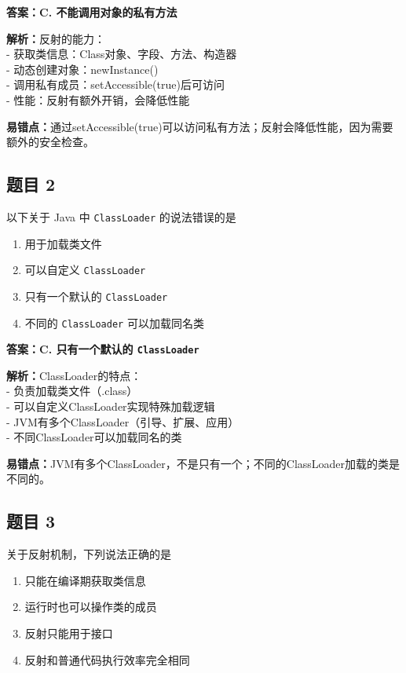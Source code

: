 \documentclass[12pt,a4paper]{ctexart}
\begin{document}
\begin{answerbox}
	\textbf{答案：C. 不能调用对象的私有方法}

	\textbf{解析：}反射的能力：\\
	- 获取类信息：Class对象、字段、方法、构造器\\
	- 动态创建对象：newInstance()\\
	- 调用私有成员：setAccessible(true)后可访问\\
	- 性能：反射有额外开销，会降低性能

	\textbf{易错点：}通过setAccessible(true)可以访问私有方法；反射会降低性能，因为需要额外的安全检查。
\end{answerbox}

\subsection*{题目 2}
以下关于 Java 中 \texttt{ClassLoader} 的说法错误的是
\begin{enumerate}[label=\Alph*.]
	\item 用于加载类文件
	\item 可以自定义 \texttt{ClassLoader}
	\item 只有一个默认的 \texttt{ClassLoader}
	\item 不同的 \texttt{ClassLoader} 可以加载同名类
\end{enumerate}

\begin{answerbox}
	\textbf{答案：C. 只有一个默认的 \texttt{ClassLoader}}

	\textbf{解析：}ClassLoader的特点：\\
	- 负责加载类文件（.class）\\
	- 可以自定义ClassLoader实现特殊加载逻辑\\
	- JVM有多个ClassLoader（引导、扩展、应用）\\
	- 不同ClassLoader可以加载同名的类

	\textbf{易错点：}JVM有多个ClassLoader，不是只有一个；不同的ClassLoader加载的类是不同的。
\end{answerbox}

\subsection*{题目 3}
关于反射机制，下列说法正确的是
\begin{enumerate}[label=\Alph*.]
	\item 只能在编译期获取类信息
	\item 运行时也可以操作类的成员
	\item 反射只能用于接口
	\item 反射和普通代码执行效率完全相同
\end{enumerate}
\end{document}
